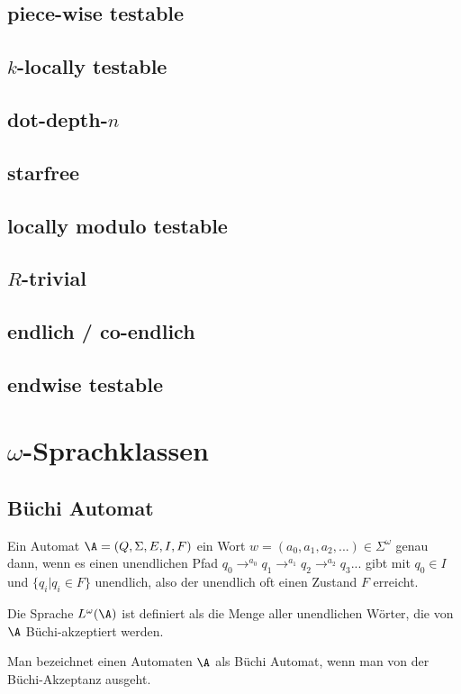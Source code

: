 \subsection{piece-wise testable}


\subsection{$k$-locally testable}


\subsection{dot-depth-$n$}
\subsection{starfree}
\subsection{locally modulo testable}
\subsection{$R$-trivial}
\subsection{endlich / co-endlich}
\subsection{endwise testable}

\section{$\omega$-Sprachklassen}
\subsection{Büchi Automat}
Ein Automat $\A = (Q, \Sigma, E, I, F)$  ein Wort $w = (a_0,a_1,a_2,...) \in \Sigma^\omega$ genau dann, wenn es einen unendlichen Pfad $q_0 \rightarrow^{a_0} q_1 \rightarrow^{a_1} q_2 \rightarrow^{a_2} q_3 ...$ gibt mit $q_0 \in I$ und $\{ q_i | q_i \in F \}$ unendlich, also der unendlich oft einen Zustand $F$ erreicht.

Die Sprache $L^\omega(\A)$ ist definiert als die Menge aller unendlichen Wörter, die von $\A$ Büchi-akzeptiert werden.

Man bezeichnet einen Automaten $\A$ als Büchi Automat, wenn man von der Büchi-Akzeptanz ausgeht.

